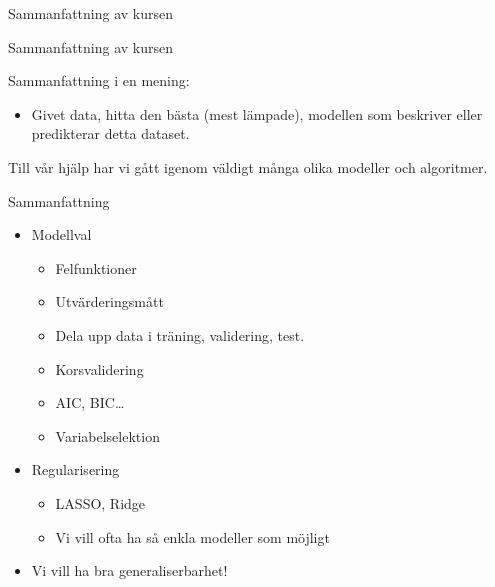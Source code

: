 \documentclass[10pt,english]{beamer}
\begin{document}
\begin{frame}[standout]
    \Huge Sammanfattning av kursen
\end{frame}

\begin{frame}{Sammanfattning av kursen}

    Sammanfattning i en mening:
    \begin{itemize}
        \item Givet data, hitta den bästa (mest lämpade), modellen som beskriver eller predikterar detta dataset.
    \end{itemize}

    Till vår hjälp har vi gått igenom väldigt många olika modeller och algoritmer.
    
\end{frame}

\begin{frame}{Sammanfattning}
    \begin{itemize}
        \item Modellval
        \begin{itemize}
            \item Felfunktioner
            \item Utvärderingsmått
            \item Dela upp data i träning, validering, test.
            \item Korsvalidering
            \item AIC, BIC\dots
            \item Variabelselektion
        \end{itemize}
        \item Regularisering
        \begin{itemize}
            \item LASSO, Ridge
            \item Vi vill ofta ha så enkla modeller som möjligt
        \end{itemize}
        \item Vi vill ha bra generaliserbarhet!
    \end{itemize}
\end{frame}
\end{document}
